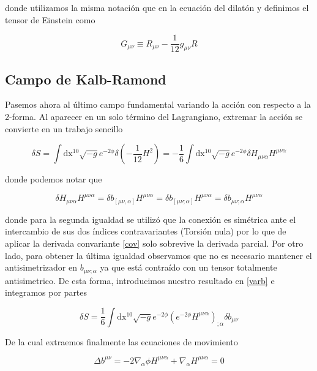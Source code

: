 \documentclass{article}
\numberwithin{equation}{section}
\begin{document}
donde utilizamos la misma notación que en la ecuación del dilatón y definimos el tensor de Einstein como

\begin{equation}\label{G}
G_{\mu\nu} \equiv R_{\mu\nu} - \frac{1}{12} g_{\mu\nu} R
\end{equation}

\subsection{Campo de Kalb-Ramond}

Pasemos ahora al último campo fundamental variando la acción con respecto a la 2-forma. Al aparecer en un solo término del Lagrangiano, extremar la acción se convierte en un trabajo sencillo

\begin{equation}\label{varb}
\delta S = \int\mathrm{dx^{10}}\sqrt{-g} e^{-2\phi} \delta \left( -\frac{1}{12}H^2\right) = -\frac{1}{6}\int\mathrm{dx^{10}}\sqrt{-g} e^{-2\phi} \delta H_{\mu \nu \alpha} H^{\mu \nu \alpha}
\end{equation}

donde podemos notar que

\begin{equation}\label{key}
\delta H_{\mu \nu \alpha} H^{\mu \nu \alpha} = \delta b_{\left[ \mu \nu , \alpha\right]} H^{\mu \nu\alpha}  = \delta b_{ \left[\mu \nu ; \alpha\right]} H^{\mu \nu\alpha} = \delta b_{ \mu \nu ; \alpha} H^{\mu \nu\alpha}
\end{equation}

donde para la segunda igualdad se utilizó que la conexión es simétrica ante el intercambio de sus dos índices contravariantes (Torsión nula) por lo que de aplicar la derivada convariante \ref{cov} solo sobrevive la derivada parcial. Por otro lado, para obtener la última igualdad observamos que no es necesario mantener el antisimetrizador en $ b_{\mu\nu ; \alpha} $ ya que está contraído con un tensor totalmente antisimetrico. De esta forma, introducimos nuestro resultado en \ref{varb} e integramos por partes 

\begin{equation}\label{key}
\delta S =\frac{1}{6}\int\mathrm{dx^{10}}\sqrt{-g} e^{-2\phi} \left( e^{-2 \phi} H^{\mu\nu \alpha}\right)_{ ; \alpha} \delta b_{\mu\nu} 
\end{equation}

De la cual extraemos finalmente las ecuaciones de movimiento

\begin{boxquation}
\begin{equation}\label{key}
\Delta b^{\mu\nu} = -2 \nabla_{\alpha} \phi  H^{\mu\nu \alpha} +  \nabla_{\alpha}H^{\mu\nu \alpha}=0
\end{equation}
\end{boxquation}
\end{document}
